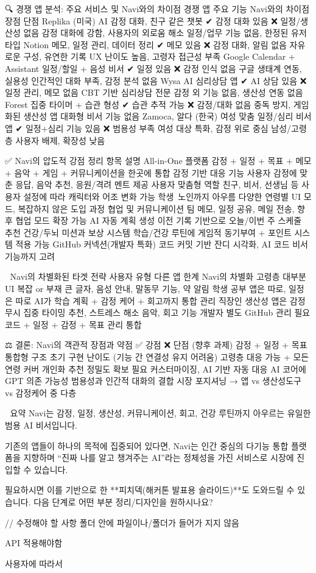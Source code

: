 🔍 경쟁 앱 분석: 주요 서비스 및 Navi와의 차이점
경쟁 앱	주요 기능	Navi와의 차이점	장점	단점
Replika (미국)	AI 감정 대화, 친구 같은 챗봇	✔ 감정 대화 있음
❌ 일정/생산성 없음	감정 대화에 강함, 사용자의 외로움 해소	일정/업무 기능 없음, 한정된 유저 타입
Notion	메모, 일정 관리, 데이터 정리	✔ 메모 있음
❌ 감정 대화, 알림 없음	자유로운 구성, 유연한 기록	UX 난이도 높음, 고령자 접근성 부족
Google Calendar + Assistant	일정/할일 + 음성 비서	✔ 일정 있음
❌ 감정 인식 없음	구글 생태계 연동, 실용성	인간적인 대화 부족, 감정 분석 없음
Wysa	AI 심리상담 앱	✔ AI 상담 있음
❌ 일정 관리, 메모 없음	CBT 기반 심리상담 전문	감정 외 기능 없음, 생산성 연동 없음
Forest	집중 타이머 + 습관 형성	✔ 습관 추적 가능
❌ 감정/대화 없음	중독 방지, 게임화된 생산성 앱	대화형 비서 기능 없음
Zamoca, 알다 (한국)	여성 맞춤 일정/심리 비서 앱	✔ 일정+심리 기능 있음
❌ 범용성 부족	여성 대상 특화, 감정 위로 중심	남성/고령층 사용자 배제, 확장성 낮음

✅ Navi의 압도적 강점 정리
항목	설명
All-in-One 플랫폼	감정 + 일정 + 목표 + 메모 + 음악 + 게임 + 커뮤니케이션을 한곳에 통합
감정 기반 대응 기능	사용자 감정에 맞춘 응답, 음악 추천, 응원/격려 멘트 제공
사용자 맞춤형 역할	친구, 비서, 선생님 등 사용자 설정에 따라 캐릭터와 어조 변화 가능
학생~노인까지 아우름	다양한 연령별 UI 모드, 복잡하지 않은 도입 과정
협업 및 커뮤니케이션	팀 메모, 일정 공유, 메일 전송, 향후 협업 모드 확장 가능
AI 자동 계획 생성	이전 기록 기반으로 오늘/이번 주 스케줄 추천
건강/두뇌 미션과 보상 시스템	학습/건강 루틴에 게임적 동기부여 + 포인트 시스템 적용 가능
GitHub 커넥션(개발자 특화)	코드 커밋 기반 잔디 시각화, AI 코드 비서 기능까지 고려

📌 Navi의 차별화된 타겟 전략
사용자 유형	다른 앱 한계	Navi의 차별화
고령층	대부분 UI 복잡 or 부재	큰 글자, 음성 안내, 말동무 기능, 약 알림
학생	공부 앱은 따로, 일정은 따로	AI가 학습 계획 + 감정 케어 + 회고까지 통합 관리
직장인	생산성 앱은 감정 무시	집중 타이밍 추천, 스트레스 해소 음악, 회고 기능
개발자	별도 GitHub 관리 필요	코드 + 일정 + 감정 + 목표 관리 통합

⚖️ 결론: Navi의 객관적 장점과 약점
✅ 강점	❌ 단점 (향후 과제)
감정 + 일정 + 목표 통합형 구조	초기 구현 난이도 (기능 간 연결성 유지 어려움)
고령층 대응 가능 + 모든 연령 커버	개인화 추천 정밀도 확보 필요
커스터마이징, AI 기반 자동 대응	AI 코어에 GPT 의존 가능성
범용성과 인간적 대화의 결합	시장 포지셔닝 → 앱 vs 생산성도구 vs 감정케어 중 다층

🚀 요약
Navi는 감정, 일정, 생산성, 커뮤니케이션, 회고, 건강 루틴까지 아우르는 유일한 범용 AI 비서입니다.

기존의 앱들이 하나의 목적에 집중되어 있다면, Navi는 인간 중심의 다기능 통합 플랫폼을 지향하며
“진짜 나를 알고 챙겨주는 AI”라는 정체성을 가진 서비스로 시장에 진입할 수 있습니다.

필요하시면 이를 기반으로 한 **피치덱(해커톤 발표용 슬라이드)**도 도와드릴 수 있습니다.
다음 단계로 어떤 부분 정리/디자인을 원하시나요?



// 수정해야 할 사항
폴더 안에 파일이나/폴더가 들어가 지지 않음

API 적용해야함

사용자에 따라서 